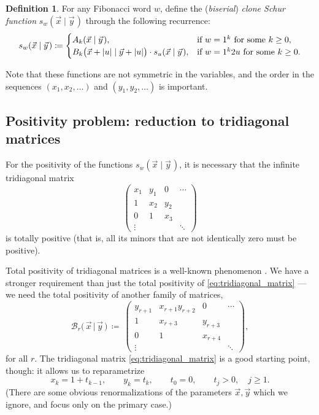\documentclass[letterpaper,11pt,oneside,reqno]{article}
\numberwithin{equation}{section}
\newcommand{\ssp}{\hspace{1pt}}
\theoremstyle{definition}
\newtheorem{definition}[proposition]{Definition}
\begin{document}
\begin{definition}
	\label{def:clone_Schur}
	For any Fibonacci word $w$,
	define the
	(\emph{biserial})
	\emph{clone Schur function} $s_w(\vec{x} \mid \vec{y}\ssp)$ through the following recurrence:
	\begin{equation}
		\label{eq:clone_Schur_recurrence_def}
		s_w (\vec{x} \mid \vec{y}\ssp)
		\coloneqq
		\begin{cases}
			A_k(\vec{x} \mid \vec{y}\ssp), & \textnormal{if $w=1^{k}$ for some $k\ge 0$},\\
			B_k\bigl( \vec{x}+|u| \mid \vec{y}+|u| \bigr)\cdot s_u (\vec{x} \mid \vec{y}\ssp)
			, & \textnormal{if $w=1^k2u$ for some $k\ge 0$}.
		\end{cases}
	\end{equation}
\end{definition}
Note that these functions are not symmetric in the variables,
and the order in the sequences $(x_1,x_2,\ldots)$ and $(y_1,y_2,\ldots)$ is important.

\subsection{Positivity problem: reduction to tridiagonal matrices}

For the positivity of the functions
$s_w(\vec{x} \mid \vec{y}\ssp)$, it is necessary that the
infinite
tridiagonal matrix
\begin{equation}
	\label{eq:tridiagonal_matrix}
	\begin{pmatrix}
	x_1 & y_1 & 0 & \cdots\\
	1 & x_2 & y_2 &\\
	0 & 1 & x_3  & \\
	\vdots & & & \ddots
	\end{pmatrix}
\end{equation}
is totally positive (that is, all its minors that are not
identically zero must be positive).

Total positivity of tridiagonal matrices is a well-known phenomenon
\cite{FominZelevinsky1999}.
We have a stronger requirement than just the total positivity
of \eqref{eq:tridiagonal_matrix} --- we need the total positivity of
another family of matrices,
\begin{equation*}
		\mathcal{B}_r \big( \, \vec{x} \, \big| \, \vec{y} \, \big) \, \coloneqq \
		\begin{pmatrix}
		y_{r+1} & x_{r+1} y_{r+2} & 0 & \cdots\\
		1 & x_{r+3} & y_{r+3} &\\
		0 & 1 & x_{r+4}  & \\
		\vdots & & & \ddots
	\end{pmatrix},
\end{equation*}
for all $r$. The tridiagonal matrix \eqref{eq:tridiagonal_matrix} is a good starting point,
though: it allows us to reparametrize
\begin{equation*}
	x_k=1+t_{k-1},\qquad y_k=t_k,\qquad t_0=0, \qquad t_j>0, \quad j\ge 1.
\end{equation*}
(There are some obvious renormalizations of the parameters
$\vec x,\vec y$
which we ignore, and
focus only on the primary case.)
\end{document}
